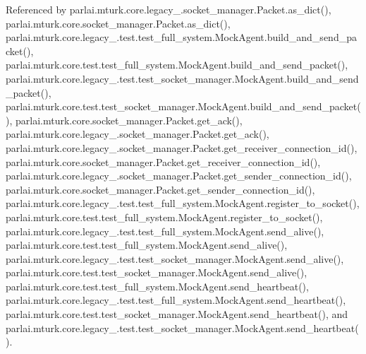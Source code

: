 Referenced by parlai.\+mturk.\+core.\+legacy\+\_.\+socket\+\_\+manager.\+Packet.\+as\+\_\+dict(), parlai.\+mturk.\+core.\+socket\+\_\+manager.\+Packet.\+as\+\_\+dict(), parlai.\+mturk.\+core.\+legacy\+\_.\+test.\+test\+\_\+full\+\_\+system.\+Mock\+Agent.\+build\+\_\+and\+\_\+send\+\_\+packet(), parlai.\+mturk.\+core.\+test.\+test\+\_\+full\+\_\+system.\+Mock\+Agent.\+build\+\_\+and\+\_\+send\+\_\+packet(), parlai.\+mturk.\+core.\+legacy\+\_.\+test.\+test\+\_\+socket\+\_\+manager.\+Mock\+Agent.\+build\+\_\+and\+\_\+send\+\_\+packet(), parlai.\+mturk.\+core.\+test.\+test\+\_\+socket\+\_\+manager.\+Mock\+Agent.\+build\+\_\+and\+\_\+send\+\_\+packet(), parlai.\+mturk.\+core.\+socket\+\_\+manager.\+Packet.\+get\+\_\+ack(), parlai.\+mturk.\+core.\+legacy\+\_.\+socket\+\_\+manager.\+Packet.\+get\+\_\+ack(), parlai.\+mturk.\+core.\+legacy\+\_.\+socket\+\_\+manager.\+Packet.\+get\+\_\+receiver\+\_\+connection\+\_\+id(), parlai.\+mturk.\+core.\+socket\+\_\+manager.\+Packet.\+get\+\_\+receiver\+\_\+connection\+\_\+id(), parlai.\+mturk.\+core.\+legacy\+\_.\+socket\+\_\+manager.\+Packet.\+get\+\_\+sender\+\_\+connection\+\_\+id(), parlai.\+mturk.\+core.\+socket\+\_\+manager.\+Packet.\+get\+\_\+sender\+\_\+connection\+\_\+id(), parlai.\+mturk.\+core.\+legacy\+\_.\+test.\+test\+\_\+full\+\_\+system.\+Mock\+Agent.\+register\+\_\+to\+\_\+socket(), parlai.\+mturk.\+core.\+test.\+test\+\_\+full\+\_\+system.\+Mock\+Agent.\+register\+\_\+to\+\_\+socket(), parlai.\+mturk.\+core.\+legacy\+\_.\+test.\+test\+\_\+full\+\_\+system.\+Mock\+Agent.\+send\+\_\+alive(), parlai.\+mturk.\+core.\+test.\+test\+\_\+full\+\_\+system.\+Mock\+Agent.\+send\+\_\+alive(), parlai.\+mturk.\+core.\+legacy\+\_.\+test.\+test\+\_\+socket\+\_\+manager.\+Mock\+Agent.\+send\+\_\+alive(), parlai.\+mturk.\+core.\+test.\+test\+\_\+socket\+\_\+manager.\+Mock\+Agent.\+send\+\_\+alive(), parlai.\+mturk.\+core.\+test.\+test\+\_\+full\+\_\+system.\+Mock\+Agent.\+send\+\_\+heartbeat(), parlai.\+mturk.\+core.\+legacy\+\_.\+test.\+test\+\_\+full\+\_\+system.\+Mock\+Agent.\+send\+\_\+heartbeat(), parlai.\+mturk.\+core.\+test.\+test\+\_\+socket\+\_\+manager.\+Mock\+Agent.\+send\+\_\+heartbeat(), and parlai.\+mturk.\+core.\+legacy\+\_.\+test.\+test\+\_\+socket\+\_\+manager.\+Mock\+Agent.\+send\+\_\+heartbeat().

\mbox{\label{classparlai_1_1mturk_1_1core_1_1legacy__2018_1_1socket__manager_1_1Packet_a0545e4302a6a6c212479c583009b00d1}} 
